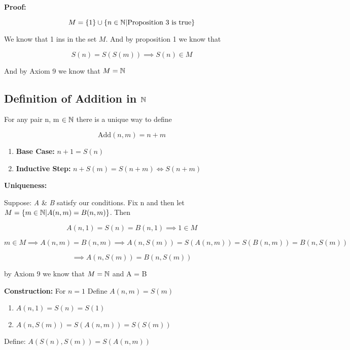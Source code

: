 \textbf{Proof:}

\[
	M = \{1\} \cup\{n \in \mathbb{N} | \text{Proposition 3 is true}\}
\]

We know that 1 ins in the set \(M\). And by proposition 1 we know that

\[
	S(n) = S(S(m)) \implies S(n) \in M
\]

And by Axiom 9 we know that \(M = \mathbb{N}\)

\subsection{Definition of Addition in \texorpdfstring{\(\mathbb{N}\)}{}}

For any pair n, m \(\in \mathbb{N}\) there is a unique way to define

\[
	\text{Add}(n , m) = n + m
\]

\begin{enumerate}
	
	\item \textbf{Base Case:} \(n + 1 = S(n)\)

	\item \textbf{Inductive Step:} \(n + S(m) = S(n + m) \iff S(n + m)\)

\end{enumerate}

\textbf{Uniqueness:} 

Suppose: \textit{A} \& \textit{B} satisfy our conditions. Fix n and then let \(M = \{ m \in \mathbb{N} | 
A(n,m) = B(n, m)\}\). Then

\[
	A(n,1) = S(n) = B(n,1) \implies 1 \in M
\]

\[
	m \in M \implies A(n, m) = B(n, m) \implies A(n, S(m)) = S(A(n, m)) = S(B(n, m)) = B(n, S(m))
\]

\[
	\implies A(n , S(m)) = B(n, S(m))
\]

by Axiom 9 we know that \(M = \mathbb{N}\) and A = B

\textbf{Construction:} For \(n = 1\) Define \(A(n, m) = S(m)\)

\begin{enumerate}
	
	\item \(A(n, 1) = S(n) = S(1)\)
	
	\item \(A(n, S(m)) = S(A(n, m)) = S(S(m))\)

\end{enumerate}

Define: \(A(S(n), S(m)) = S(A(n, m))\)

